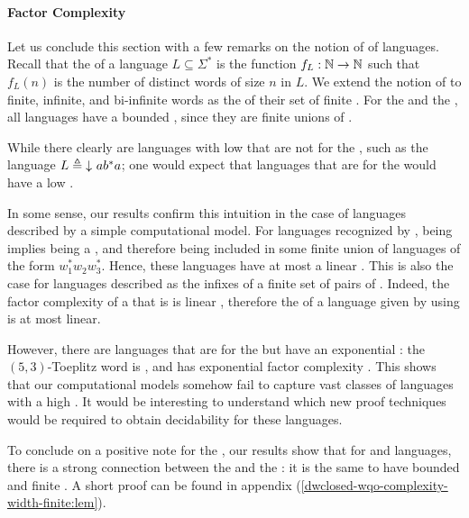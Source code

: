 \paragraph*{Factor Complexity} \AP Let us conclude this section with a few
remarks on the notion of  of languages. Recall that the
 of a language $L \subseteq \Sigma^*$ is the function
$f_L: \mathbb{N} \to \mathbb{N}$ such that $f_L(n)$ is the number of distinct words of size
$n$ in $L$. We extend the notion of  to finite, infinite,
and bi-infinite words as the  of their set of finite
. For the  and the , all
 languages have a bounded , since
they are finite unions of .

While there clearly are languages with low  that are not
 for the , such as the language $L
\defined \dwset{ a b^* a }$; one would expect that languages that are
 for the  would have a low .

In some sense, our results confirm this intuition in the case of languages
described by a simple computational model. For languages recognized by
, being  implies being a
, and therefore being  included in some finite union of
languages of the form $w_1^* w_2 w_3^*$. Hence, these languages have at most a
linear . This is also the case for languages described
as the infixes of a finite set of pairs of . Indeed, the
factor complexity of a  that is 
is linear \cite[Theorem 24]{NIPR09}, therefore the  of a
language given by  using  is
at most linear. 

However, there are  languages that are
 for the  but have an exponential
: the $(5, 3)$-Toeplitz word is 
\cite[p. 499]{CAKA97}, and has exponential factor complexity \cite[Theorem
5]{CAKA97}. This shows that our computational models somehow fail to capture
vast classes of  languages with a high . It would be interesting to understand which new proof techniques
would be required to obtain decidability for these languages.

To conclude on a positive note for the , our results show
that for  and  languages, there is
a strong connection between the  and the : it is the same to have bounded  and finite
. A short proof can be found in appendix 
(\cref{dwclosed-wqo-complexity-width-finite:lem}). 

